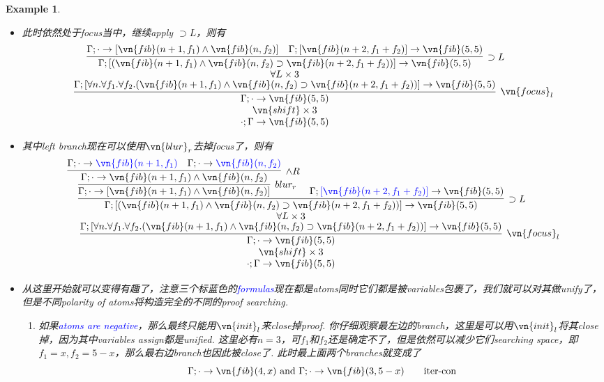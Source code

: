 \documentclass{article}
\theoremstyle{plain}
\newtheorem{example}[theorem]{Example}
\theoremstyle{nonumberplain}
\newcommand{\bluet}[1]{\textcolor{blue}{#1}}
\begin{document}
\begin{example}
\begin{itemize}
	$$
	\deduce{\cdot;\Gamma \to \vn{fib}(5,5)}{\deduce{\vn{shift} \times 3}{\infer[\vn{focus}_l]{\Gamma;\cdot \to \vn{fib}(5,5)}{\deduce{\Gamma;[\forall n.\forall f_1.\forall f_2.(\vn{fib}(n+1,f_1)\wedge\vn{fib}(n,f_2) \supset \vn{fib}(n+2,f_1+f_2))] \to \vn{fib}(5,5)}{\deduce{\forall L \times 3}{\Gamma;[(\vn{fib}(n+1,f_1),\vn{fib}(n,f_2) \supset \vn{fib}(n+2,f_1+f_2))] \to \vn{fib}(5,5)}}}}}
	$$
	\item 此时依然处于focus当中，继续apply $\supset L$，则有
	$$
	\deduce{\cdot;\Gamma \to \vn{fib}(5,5)}{\deduce{\vn{shift} \times 3}{\infer[\vn{focus}_l]{\Gamma;\cdot \to \vn{fib}(5,5)}{\deduce{\Gamma;[\forall n.\forall f_1.\forall f_2.(\vn{fib}(n+1,f_1)\wedge\vn{fib}(n,f_2) \supset \vn{fib}(n+2,f_1+f_2))] \to \vn{fib}(5,5)}{\deduce{\forall L \times 3}{\infer[\supset L]{\Gamma;[(\vn{fib}(n+1,f_1)\wedge\vn{fib}(n,f_2) \supset \vn{fib}(n+2,f_1+f_2))] \to \vn{fib}(5,5)}{\Gamma;\cdot \to [\vn{fib}(n+1,f_1) \wedge \vn{fib}(n, f_2)]  &  \Gamma; [\vn{fib}(n+2, f_1 + f_2)] \to \vn{fib}(5,5)  }}}}}}
	$$
	\item 其中left branch现在可以使用$\vn{blur}_r$去掉focus了，则有
	$$
	\deduce{\cdot;\Gamma \to \vn{fib}(5,5)}{\deduce{\vn{shift} \times 3}{\infer[\vn{focus}_l]{\Gamma;\cdot \to \vn{fib}(5,5)}{\deduce{\Gamma;[\forall n.\forall f_1.\forall f_2.(\vn{fib}(n+1,f_1)\wedge\vn{fib}(n,f_2) \supset \vn{fib}(n+2,f_1+f_2))] \to \vn{fib}(5,5)}{\deduce{\forall L \times 3}{\infer[\supset L]{\Gamma;[(\vn{fib}(n+1,f_1)\wedge\vn{fib}(n,f_2) \supset \vn{fib}(n+2,f_1+f_2))] \to \vn{fib}(5,5)}{\infer[blur_r]{\Gamma;\cdot \to [\vn{fib}(n+1,f_1) \wedge \vn{fib}(n, f_2)]}{\infer[\wedge R]{\Gamma;\cdot \to \vn{fib}(n+1,f_1) \wedge \vn{fib}(n, f_2)}{\Gamma;\cdot \to \bluet{\vn{fib}(n+1,f_1)} & \Gamma;\cdot \to  \bluet{\vn{fib}(n, f_2)}}}  &  \Gamma; \bluet{[\vn{fib}(n+2, f_1 + f_2)]} \to \vn{fib}(5,5)  }}}}}}
	$$
	\item 从这里开始就可以变得有趣了，注意三个标蓝色的\bluet{formulas}现在都是atoms同时它们都是被variables包裹了，我们就可以对其做unify了，但是不同polarity of atoms将构造完全的不同的proof searching. 
	\begin{enumerate}
		\item 如果\bluet{atoms are negative}，那么最终只能用$\vn{init}_l$来close掉proof. 你仔细观察最左边的branch，这里是可以用$\vn{init}_l$将其close掉，因为其中variables assign都是unified. 这里必有$n = 3$，可$f_1$和$f_2$还是确定不了，但是依然可以减少它们searching space，即$f_1 = x, f_2 = 5-x$，那么最右边branch也因此被close了. 此时最上面两个branches就变成了
		\[
			\Gamma;\cdot \to \vn{fib}(4, x)~\text{and}~\Gamma;\cdot \to \vn{fib}(3,5-x)~~~~~~\text{iter-con}
\]
\end{enumerate}
\end{itemize}
\end{example}
\end{document}
